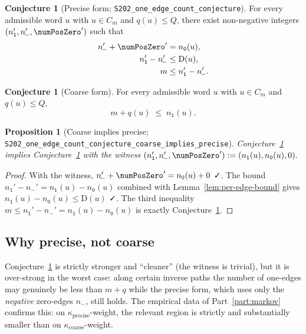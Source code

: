 \documentclass[11pt,a4paper]{article}
\theoremstyle{plain}
\newtheorem{proposition}[theorem]{Proposition}
\theoremstyle{definition}
\newtheorem{conjecture}[theorem]{Conjecture}
\newcommand{\defect}{\mathrm{D}}
\newcommand{\numOnes}{n_{\mathtt{1}}}
\newcommand{\numNeg}{n_{\!-}}
\newcommand{\numZeros}{n_{\mathtt{0}}}
\begin{document}
\begin{conjecture}[Precise form; \texttt{S202\_one\_edge\_count\_conjecture}]
\label{conj:precise}
For every admissible word $u$ with $u \in C_m$ and $q(u) \le Q$,
there exist non-negative integers
$(\numOnes', \numNeg', \numPosZero')$ such that
\begin{align*}
  \numNeg' + \numPosZero' &= \numZeros(u), \\
  \numOnes' - \numNeg' &\le \defect(u), \\
  m &\le \numOnes' - \numNeg'.
\end{align*}
\end{conjecture}

\begin{conjecture}[Coarse form]
\label{conj:coarse}
For every admissible word $u$ with $u \in C_m$ and $q(u) \le Q$,
\[
  m + q(u) \;\le\; \numOnes(u).
\]
\end{conjecture}

\begin{proposition}[Coarse implies precise;
\texttt{S202\_one\_edge\_count\_conjecture\_coarse\_implies\_precise}]
\label{prop:coarse-implies-precise}
Conjecture~\ref{conj:coarse} implies Conjecture~\ref{conj:precise}
with the witness
\(
  (\numOnes', \numNeg', \numPosZero') := (\numOnes(u), \numZeros(u), 0).
\)
\end{proposition}

\begin{proof}
With the witness, $\numNeg' + \numPosZero' = \numZeros(u) + 0$ ✓.
The bound $\numOnes' - \numNeg' = \numOnes(u) - \numZeros(u)$
combined with Lemma~\ref{lem:per-edge-bound} gives
$\numOnes(u) - \numZeros(u) \le \defect(u)$ ✓. The third inequality
$m \le \numOnes' - \numNeg' = \numOnes(u) - \numZeros(u)$ is
exactly Conjecture~\ref{conj:coarse}.
\end{proof}

\subsection{Why precise, not coarse}

Conjecture~\ref{conj:coarse} is strictly stronger and ``cleaner''
(the witness is trivial), but it is over-strong in the worst case:
along certain inverse paths the number of one-edges may genuinely
be less than $m + q$ while the precise form, which uses only the
\emph{negative} zero-edges $\numNeg$, still holds. The empirical
data of Part~\ref{part:markov} confirms this: on
$\kappa_{\mathrm{precise}}$-weight, the relevant region is
strictly and substantially smaller than on
$\kappa_{\mathrm{coarse}}$-weight.
\end{document}
